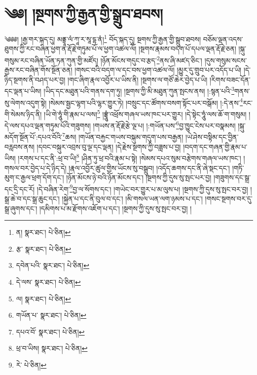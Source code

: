 \setcounter{footnote}{0} 
\chapter{༄༅། །སྔགས་ཀྱི་རྒྱན་གྱི་སྒྲུབ་ཐབས།}༄༅༅། །རྒྱ་གར་སྐད་དུ། མནྟྲཱ་ལཾ་ཀཱ་ར་སཱ་དྷ་ནཾ།\footnote{ན།  སྣར་ཐང་།  པེ་ཅིན། } བོད་སྐད་དུ། སྔགས་ཀྱི་རྒྱན་གྱི་སྒྲུབ་ཐབས། བཅོམ་ལྡན་འདས་ཐུགས་ཀྱི་རང་བཞིན་ཕྱག་ན་རྡོ་རྗེ་གཏུམ་པོ་ལ་ཕྱག་འཚལ་ལོ། །སྔགས་རྣམས་བདག་པོ་དཔལ་ལྡན་རྡོ་རྗེ་ཅན། །སྐུ་གསུམ་རང་བཞིན་ཡོན་ཏན་ཀུན་གྱི་མཛོད། །ཉོན་མོངས་གདུང་བ་རྩད་\footnote{རྩ་  སྣར་ཐང་།  པེ་ཅིན། }ནས་ཞི་མཛད་ཅིང་། །དུས་གསུམ་སངས་རྒྱས་རང་བཞིན་གོས་སྔོན་ཅན། །གསང་བའི་བདག་ལ་དང་བས་ཕྱག་འཚལ་ལོ། །མྱུར་དུ་གྲུབ་པར་འདོད་པ་ཡི། །དེ་ཉིད་སྔགས་ནི་བཤད་པར་བྱ། །གང་ཞིག་རྣལ་འབྱོར་པ་ཡིས་ནི། །སྔགས་ལ་གཙོ་ཆེར་བྱེད་པ་ཡི། །རིགས་བཟང་དོན་དང་ལྡན་པ་ཡིས། །ཡིད་དང་མཐུན་པའི་གནས་དག་ཏུ། །སྔགས་ཀྱི་མི་མཐུན་ཀུན་སྤངས་ནས། །:སྙན་པའི་\footnote{དབེན་པའི་  སྣར་ཐང་།  པེ་ཅིན། }གནས་སུ་ལེགས་འདུག་སྟེ། །སེམས་སྦྱང་ལྷག་པའི་ལྷར་གྱུར་ཏེ། །བསྲུང་དང་ཚོགས་བསག་སྟོང་པར་བསྒོམ། །:དེ་ནས་\footnote{དེ་ལས་  སྣར་ཐང་།  པེ་ཅིན། }རང་གི་སེམས་ཉིད་ནི། །ཡི་གེ་ཧཱུཾ་གི་རྣམ་པ་ལས།\footnote{ལ།  སྣར་ཐང་།  པེ་ཅིན། } །བྷྲཱུཾ་འཕྲོས་གཞལ་ཡས་ཁང་པར་གྱུར། །དེ་སྟེང་ཧཱུཾ་ལས་ཆོ་ག་གསུམ། །དེ་ལས་དཔའ་ལྡན་གཏུམ་པོའི་གཟུགས། །གཡས་ན་རྡོ་རྗེ་རྩེ་ལྔ་པ། །:གཡོན་པས་\footnote{གཡོན་པ་  སྣར་ཐང་།  པེ་ཅིན། }བྱ་ཁྱུང་ངེས་པར་བསྣམས། །སྐུ་མདོག་སྔོན་པོ་:དཔའ་བོའི་\footnote{དཔའ་བོ་  སྣར་ཐང་།  པེ་ཅིན། }ཆས། །གཡོན་བརྐྱང་གཡས་བསྐུམ་གདུག་པས་བརྒྱན། །ཡེ་ཤེས་བསྟིམ་དང་བྱིན་བརླབས་ནས། །དབང་བསྐུར་འབྲས་བུ་ལྔ་དང་ལྡན། །དེ་རྗེས་སྔགས་ཀྱི་བཟླས་པ་བྱ། །བདག་དང་གཞན་གྱི་རྣམ་པ་ཡིས། །རགས་པ་དང་ནི་:ཕྲ་བ་ཡི།\footnote{ཕྲ་བ་ཡིས།  སྣར་ཐང་།  པེ་ཅིན། } །ཤིན་ཏུ་ཕྲ་བའི་རྣམ་པ་སྟེ། །སེམས་དཔའ་སུམ་བརྩེགས་གཞལ་ཡས་ཁང་། །གསལ་བར་བྱེད་པ་དེ་ཉིད་དེ། །རྣལ་འབྱོར་ཚུལ་གྱིས་ཡོངས་སུ་བསྒྲུབ། །འདོད་ཆགས་དང་ནི་ཞེ་སྡང་དང་། །གཏི་མུག་ང་རྒྱལ་ཕྲག་དོག་དང་། །ཉོན་མོངས་ཉེ་བའི་ཉོན་མོངས་དང་། །སྔགས་ཀྱི་དུས་སུ་སྤང་པར་བྱ། །གཟུགས་དང་སྒྲ་དང་དྲི་དང་རོ། །དེ་བཞིན་རེག་\footnote{རེ་  པེ་ཅིན། }བྱ་ལ་སོགས་དང་། །གཡེང་བར་གྱུར་པ་མ་ལུས་པ། །སྔགས་ཀྱི་དུས་སུ་སྤང་བར་བྱ། །སྒྲ་ཆེ་བ་དང་སྒྲ་ཆུང་དང་། །སྐྱེན་པ་དང་ནི་བུལ་བ་དང་། །མི་གསལ་ཡན་ལག་ཉམས་པ་དང་། །གསང་སྔགས་བར་དུ་སྒྲ་ཞུགས་དང་། །དམིགས་པ་མ་རྫོགས་འཇོག་པ་དང་། །སྔགས་ཀྱི་དུས་སུ་སྤང་བར་བྱ། །
